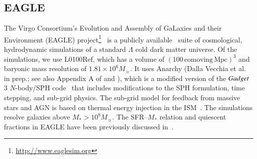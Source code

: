 \documentclass[tighten, preprint]{aastex62}
\begin{document}
\subsection{EAGLE}
The Virgo Consortium's Evolution and Assembly of GaLaxies and their 
Environment (EAGLE) project\footnote{\url{http://www.eaglesim.org}}~\citep{schaye2015, crain2015} is a publicly available~\citep{mcalpine2016} suite 
of cosmological, hydrodynamic simulations of a standard 
$\Lambda$ cold dark matter universe. Of the simulations, we use 
L0100Ref, which has a volume of $(100\,\mathrm{comoving\,Mpc})^3$ and 
baryonic mass resolution of $1.81\times 10^6M_{\sun}$. 
It uses {\sc Anarchy} (Dalla Vecchia et al. in prep.; 
see also Appendix A of \citealt{schaye2015} and \citealt{schaller2015}), 
which is a modified version of the ${\sc Gadget}$ 3 $N$-body/SPH code~\citep{springel2005} 
that includes modifications to the SPH formulation, time stepping, and 
sub-grid physics. The sub-grid model for feedback from massive stars 
and AGN is based on thermal energy injection in the ISM~\citep{dallavecchia2012}.  
The simulations resolve galaxies above $M_* > 10^{8} M_\sun$. %
The SFR--$M_*$ relation and quiescent fractions in EAGLE have been 
previously discussed in~\citet{furlong2015, trayford2015, trayford2017}. 
\end{document}
